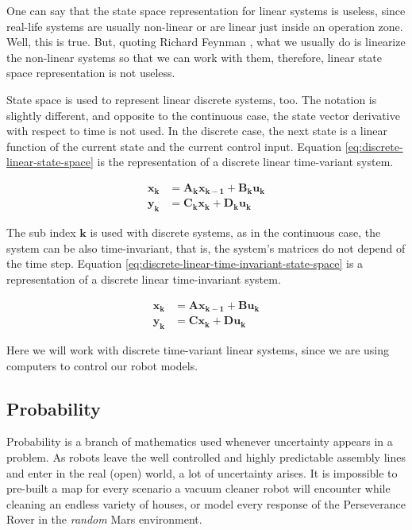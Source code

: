 \documentclass[12pt]{article}
\newcommand{\bvec}[1]{\boldsymbol{\mathbf{#1}}} %
\newcommand{\mat}[1]{\boldsymbol{\mathbf{#1}}}
\begin{document}
One can say that the state space representation for linear systems is useless, since real-life systems are usually non-linear or are linear just inside an operation zone. Well, this is true. But, quoting Richard Feynman , what we usually do is linearize the non-linear systems so that we can work with them, therefore, linear state space representation is not useless.

State space is used to represent linear discrete systems, too. The notation is slightly different, and opposite to the continuous case, the state vector derivative with respect to time is not used. In the discrete case, the next state is a linear function of the current state and the current control input. Equation \ref{eq:discrete-linear-state-space} is the representation of a discrete linear time-variant system.

\begin{equation}
    \begin{aligned}
        \bvec{x_{k}} &= \mat{A_k} \bvec{x_{k-1}} + \mat{B_k} \bvec{u_k} \\
        \bvec{y_k} &= \mat{C_k} \bvec{x_k} + \mat{D_k} \bvec{u_k}
    \end{aligned}
    \label{eq:discrete-linear-state-space}
\end{equation}

The sub index $\mathbf{k}$ is used with discrete systems, as in the continuous case, the system can be also time-invariant, that is, the system's matrices do not depend of the time step. Equation \ref{eq:discrete-linear-time-invariant-state-space} is a representation of a discrete linear time-invariant system.

\begin{equation}
    \begin{aligned}
        \bvec{x_{k}} &= \mat{A} \bvec{x_{k-1}} + \mat{B} \bvec{u_k} \\
        \bvec{y_k} &= \mat{C} \bvec{x_k} + \mat{D} \bvec{u_k}
    \end{aligned}
    \label{eq:discrete-linear-time-invariant-state-space}
\end{equation}

Here we will work with discrete time-variant linear systems, since we are using computers to control our robot models.

\subsection{Probability}
Probability is a branch of mathematics used whenever uncertainty appears in a problem. As robots leave the well controlled and highly predictable assembly lines and enter in the real (open) world, a lot of uncertainty arises. It is impossible to pre-built a map for every scenario a vacuum cleaner robot will encounter while cleaning an endless variety of houses, or model every response of the Perseverance Rover in the \textit{random} Mars environment.
\end{document}
